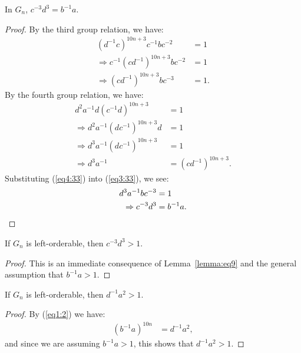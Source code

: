 \begin{lemma} In $G_n$, $c^{-3}d^{3}=b^{-1}a$.
\label{lemma:eq9}
\end{lemma}
\begin{proof} By the third group relation, we have:
\begin{align}
(d^{-1}c)^{10n+3}c^{-1}bc^{-2}&=1\nonumber{}\\
\Rightarrow{}c^{-1}(cd^{-1})^{10n+3}bc^{-2}&=1\nonumber{}\\
\Rightarrow{}(cd^{-1})^{10n+3}bc^{-3}&=1.\label{eq3:33}
\end{align}
By the fourth group relation, we have:
\begin{align}
d^{2}a^{-1}d(c^{-1}d)^{10n+3}&=1\nonumber{}\\
\Rightarrow{}d^{2}a^{-1}(dc^{-1})^{10n+3}d&=1\nonumber{}\\
\Rightarrow{}d^{3}a^{-1}(dc^{-1})^{10n+3}&=1\nonumber{}\\
\Rightarrow{}d^{3}a^{-1}&=(cd^{-1})^{10n+3}.\label{eq4:33}
\end{align}
Substituting (\ref{eq4:33}) into (\ref{eq3:33}), we see:
\begin{align*}
d^{3}a^{-1}bc^{-3}&=1\\
\Rightarrow{}c^{-3}d^{3}&=b^{-1}a.\qedhere
\end{align*}
\end{proof}

\begin{corollary} If $G_n$ is left-orderable, then $c^{-3}d^{3}>1$.
\label{corollary:inEq5}
\end{corollary}
\begin{proof}This is an immediate consequence of Lemma~\ref{lemma:eq9} and the general assumption that $b^{-1}a>1$.
\end{proof}

\begin{lemma} If $G_n$ is left-orderable, then $d^{-1}a^{2}>1$.
\label{lemma:inEq3}
\end{lemma}
\begin{proof}By (\ref{eq1:2}) we have:
\begin{align*}
(b^{-1}a)^{10n}&=d^{-1}a^{2},
\end{align*}
and since we are assuming $b^{-1}a>1$, this shows that $d^{-1}a^{2}>1$.
\end{proof}

